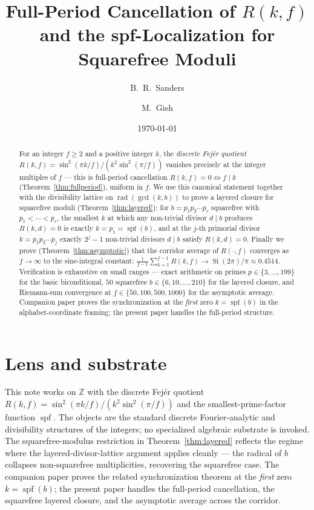 \documentclass[11pt,reqno]{amsart}
\title[Full-period cancellation of $R(k,f)$ and the spf-localization]%
{Full-Period Cancellation of $R(k, f)$\\
 and the spf-Localization for Squarefree Moduli}
\author{B.~R.~Sanders}
\author{M.~Gish}
\date{\today}
\theoremstyle{plain}
\theoremstyle{definition}
\theoremstyle{remark}
\DeclareMathOperator{\spf}{spf}
\DeclareMathOperator{\rad}{rad}
\DeclareMathOperator{\Si}{Si}
\newcommand{\Z}{\mathbb{Z}}
\begin{document}
\begin{abstract}
For an integer $f \ge 2$ and a positive integer $k$, the
\emph{discrete Fej\'er quotient} $R(k, f) = \sin^{2}(\pi k/f) /
(k^{2} \sin^{2}(\pi/f))$ vanishes precisely at the integer multiples
of $f$ --- this is full-period cancellation $R(k,f)=0 \iff f\mid k$
(Theorem~\ref{thm:fullperiod}), uniform in $f$. We use this canonical
statement together with the divisibility lattice on $\rad(\gcd(k, b))$
to prove a layered closure for squarefree moduli (Theorem~\ref{thm:layered}):
for $b = p_1 p_2 \cdots p_r$ squarefree with $p_1 < \cdots < p_r$, the
smallest $k$ at which any non-trivial divisor $d \mid b$ produces
$R(k, d) = 0$ is exactly $k = p_1 = \spf(b)$, and at the $j$-th
primorial divisor $k = p_1 p_2 \cdots p_j$ exactly $2^{j} - 1$
non-trivial divisors $d \mid b$ satisfy $R(k, d) = 0$. Finally we
prove (Theorem~\ref{thm:asymptotic}) that the corridor average of
$R(\cdot, f)$ converges as $f \to \infty$ to the sine-integral
constant: $\frac{1}{f-1}\sum_{k=1}^{f-1} R(k,f) \to \Si(2\pi)/\pi
\approx 0.4514$. Verification is exhaustive on small ranges --- exact
arithmetic on primes $p \in \{3, \ldots, 199\}$ for the basic
biconditional, $50$ squarefree $b \in \{6, 10, \ldots, 210\}$ for
the layered closure, and Riemann-sum convergence at
$f \in \{50, 100, 500, 1000\}$ for the asymptotic average. Companion
paper \cite{SandersGish2026FirstG} proves the synchronization at the
\emph{first} zero $k = \spf(b)$ in the alphabet-coordinate framing;
the present paper handles the full-period structure.
\end{abstract}

\maketitle

\section*{Lens and substrate}\label{sec:lens}

This note works on $\Z$ with the discrete Fej\'er quotient
$R(k, f) = \sin^{2}(\pi k/f) / (k^{2} \sin^{2}(\pi/f))$ and the
smallest-prime-factor function $\spf$. The objects are the standard
discrete Fourier-analytic and divisibility structures of the integers;
no specialized algebraic substrate is invoked. The squarefree-modulus
restriction in Theorem~\ref{thm:layered} reflects the regime where
the layered-divisor-lattice argument applies cleanly --- the radical
of $b$ collapses non-squarefree multiplicities, recovering the
squarefree case. The companion paper
\cite{SandersGish2026FirstG} proves the related synchronization
theorem at the \emph{first} zero $k = \spf(b)$; the present paper
handles the full-period cancellation, the squarefree layered closure,
and the asymptotic average across the corridor.
\end{document}
